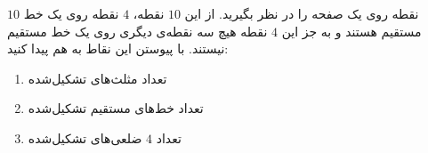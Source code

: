 \EXERCISE
$10$
نقطه روی یک صفحه را در نظر بگیرید. از این
$10$
نقطه،
$4$
نقطه روی یک خط مستقیم هستند و به جز این
$4$
نقطه هیچ سه نقطه‌ی دیگری روی یک خط مستقیم نیستند. با پیوستن این نقاط به هم پیدا کنید:
\begin{enumerate}
\item
تعداد مثلث‌های تشکیل‌شده
\item
تعداد خط‌های مستقیم تشکیل‌شده
\item
تعداد
$4$
ضلعی‌های تشکیل‌شده
\end{enumerate}